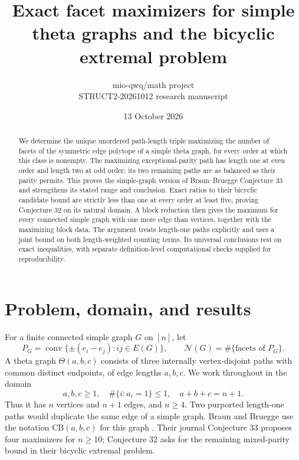 \documentclass[11pt]{article}
\title{Exact facet maximizers for simple theta graphs and the bicyclic extremal problem}
\author{mio-qwq/math project\\\small STRUCT2-20261012 research manuscript}
\date{13 October 2026}
\theoremstyle{remark}
\newcommand{\Th}{\Theta}
\newcommand{\N}{\mathcal N}
\begin{document}
\maketitle
\begin{abstract}
We determine the unique unordered path-length triple maximizing the number
of facets of the symmetric edge polytope of a simple theta graph, for every
order at which this class is nonempty. The maximizing exceptional-parity
path has length one at even order and length two at odd order; its two
remaining paths are as balanced as their parity permits. This proves the
simple-graph version of Braun--Bruegge Conjecture 33 and strengthens its
stated range and conclusion. Exact ratios to their bicyclic candidate
bound are strictly less than one at every order at least five, proving
Conjecture 32 on its natural domain. A block reduction then gives the
maximum for every connected simple graph with one more edge than vertices,
together with the maximizing block data. The argument treats length-one
paths explicitly and uses a joint bound on both length-weighted counting
terms. Its universal conclusions rest on exact inequalities, with separate
definition-level computational checks supplied for reproducibility.
\end{abstract}

\section{Problem, domain, and results}
For a finite connected simple graph $G$ on $[n]$, let
\[
 P_G=\operatorname{conv}\{\pm(e_i-e_j):ij\in E(G)\},\qquad
 \N(G)=\#\{\text{facets of }P_G\}.
\]
A theta graph $\Th(a,b,c)$ consists of three internally vertex-disjoint
paths with common distinct endpoints, of edge lengths $a,b,c$. We work
throughout in the domain
\begin{equation}\label{eq:domain}
 a,b,c\ge1,\quad \#\{i:a_i=1\}\le1,\quad a+b+c=n+1.
\end{equation}
Thus it has $n$ vertices and $n+1$ edges, and $n\ge4$. Two purported
length-one paths would duplicate the same edge of a simple graph.
Braun and Bruegge use the notation $\mathrm{CB}(a,b,c)$ for this graph
\cite{BB}. Their journal Conjecture 33 proposes four maximizers for
$n\ge10$; Conjecture 32 asks for the remaining mixed-parity bound in
their bicyclic extremal problem.
\end{document}
